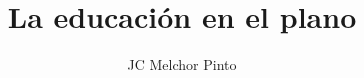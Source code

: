\documentclass[12pt,addpoints,answers]{guia}
\title{La educaci\'on en el plano}
\author{JC Melchor Pinto}
\begin{document}
\pagestyle{headandfoot}

\INFO

\begin{questions}
    
\end{questions}
\end{document}
